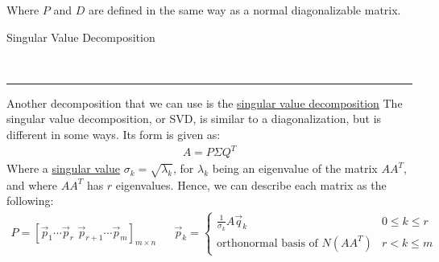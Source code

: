\documentclass{article}
\newcommand{\header}[1]{\begin{large}\noindent #1\end{large}\\\rule{\textwidth}{0.5pt}}
\newcommand{\gap}{\medskip\\}
\begin{document}
Where $P$ and $D$ are defined in the same way as a normal diagonalizable matrix.
\gap
\header{Singular Value Decomposition}
Another decomposition that we can use is the \underline{singular value decomposition}
The singular value decomposition, or SVD, is similar to a diagonalization, but is
different in some ways. Its form is given as:
\begin{align*}
    A = P\Sigma Q^T 
\end{align*}
Where a \underline{singular value} $\sigma_k = \sqrt{\lambda_k}$, for $\lambda_k$
being an eigenvalue of the matrix $AA^T$, and where $AA^T$ has $r$ eigenvalues. Hence,
we can describe each matrix as the following:
\begin{align*}
    P = [\vec{p}_1 \cdots \vec{p}_r \, \, \vec{p}_{r + 1} \cdots \vec{p}_m]_{m \times n}
&&
    \vec{p}_k = \begin{cases}
        \frac{1}{\sigma_k} A \vec{q}_k & 0 \leq k \leq r\\
        \textrm{orthonormal basis of }N(AA^T) & r < k \leq m
    \end{cases}
\end{align*}
\end{document}
